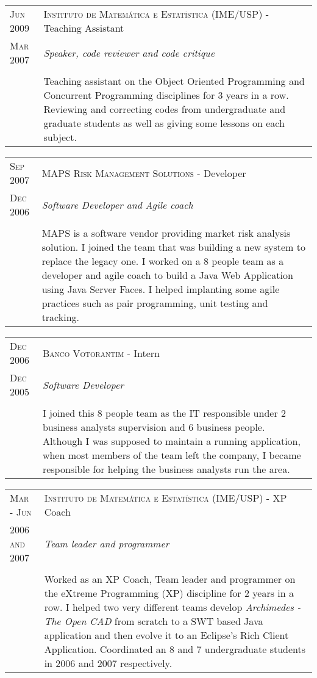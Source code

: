 \documentclass[letter,10pt]{article}
\begin{document}
\begin{tabular}{p{2.5cm}|p{13.5cm}}
  \textsc{Jun 2009} & \textsc{Instituto de Matemática e Estatística
    (IME/USP)} - Teaching Assistant\\
  \textsc{Mar 2007}& \emph{Speaker, code reviewer and code critique}\\
  &\\
  & Teaching assistant on the Object Oriented Programming and
  Concurrent Programming disciplines for
  3 years in a row. Reviewing and correcting codes from undergraduate
  and graduate students as well as giving some lessons on each subject.
\end{tabular}

\begin{tabular}{p{2.5cm}|p{13.5cm}}
  \textsc{Sep 2007} & \textsc{MAPS Risk
    Management Solutions} - Developer\\
  \textsc{Dec 2006} &\emph{Software Developer and Agile coach}\\
  &\\
  & MAPS is a software vendor providing market risk
  analysis solution. I joined the team that was building a new
  system to replace the legacy one. I worked on a 8 people team as a
  developer and agile coach to build a Java Web Application using
  Java Server Faces. I helped implanting some agile practices such as pair programming, unit
  testing and tracking.
\end{tabular}

\begin{tabular}{p{2.5cm}|p{13.5cm}}
  \textsc{Dec 2006} & \textsc{Banco Votorantim} - Intern\\
  \textsc{Dec 2005} &\emph{Software Developer}\\
  &\\
  &I joined this 8 people team as the IT responsible
  under 2 business analysts supervision and 6 business
  people. Although I was supposed to maintain a
  running application, when most members of the team left the company,
  I became responsible for helping the business analysts run the
  area.
\end{tabular}

\begin{tabular}{p{2.5cm}|p{13.5cm}}
  \textsc{Mar - Jun} & \textsc{Instituto de Matemática e Estatística
    (IME/USP)} - XP Coach\\
  \textsc{2006 and 2007}& \emph{Team leader and programmer}\\
  &\\
  &  Worked as an XP Coach, Team leader and programmer on the eXtreme
  Programming (XP) discipline for
  2 years in a row. I helped two very different teams develop
  \emph{Archimedes - The Open CAD} from scratch to a SWT based Java
  application and then evolve it to an Eclipse's Rich Client
  Application. Coordinated an 8 and 7 undergraduate students in
  2006 and 2007 respectively.
\end{tabular}
\end{document}
